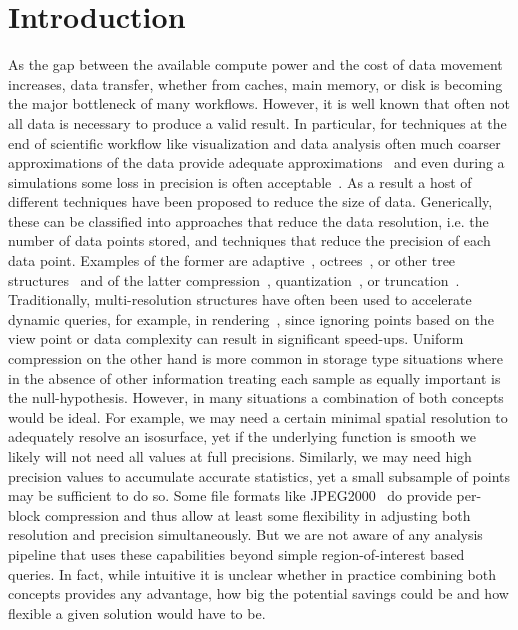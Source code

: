 \section{Introduction}

As the gap between the available compute power and the cost of data
movement increases, data transfer, whether from caches, main memory,
or disk is becoming the major bottleneck of many workflows. However,
it is well known that often not all data is necessary to produce a
valid result. In particular, for techniques at the end of scientific
workflow like visualization and data analysis often much coarser
approximations of the data provide adequate approximations~\cite{?}
and even during a simulations some loss in precision is often
acceptable~\cite{PetersSCPaper}. As a result a host of different
techniques have been proposed to reduce the size of data. Generically,
these can be classified into approaches that reduce the data
resolution, i.e. the number of data points stored, and techniques that
reduce the precision of each data point. Examples of the former are
adaptive~\cite{AMR}, octrees~\cite{?}, or other tree
structures~\cite{?} and of the latter compression~\cite{?},
quantization~\cite{?}, or truncation~\cite{?}. Traditionally,
multi-resolution structures have often been used to accelerate dynamic
queries, for example, in rendering~\cite{?}, since ignoring points
based on the view point or data complexity can result in significant
speed-ups. Uniform compression on the other hand is more common in
storage type situations where in the absence of other information
treating each sample as equally important is the
null-hypothesis. However, in many situations a combination of both
concepts would be ideal. For example, we may need a certain minimal
spatial resolution to adequately resolve an isosurface, yet if the
underlying function is smooth we likely will not need all values at
full precisions. Similarly, we may need high precision values to
accumulate accurate statistics, yet a small subsample of points may be
sufficient to do so. Some file formats like JPEG2000~\cite{?} do
provide per-block compression and thus allow at least some flexibility
in adjusting both resolution and precision simultaneously. But we are
not aware of any analysis pipeline that uses these capabilities beyond
simple region-of-interest based queries. In fact, while intuitive it
is unclear whether in practice combining both concepts provides any
advantage, how big the potential savings could be and how flexible a
given solution would have to be.

